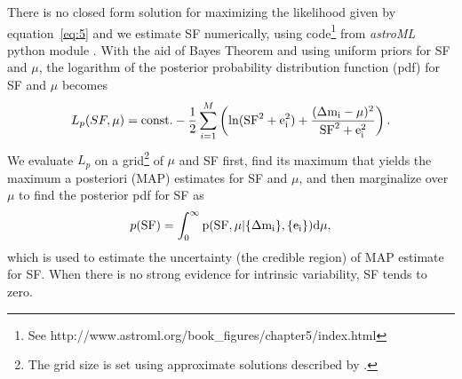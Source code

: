 \documentclass[fleqn,usenatbib]{mnras}
\begin{document}
There is no closed form solution for maximizing the likelihood given by equation~\ref{eq:5} and
we estimate SF numerically, using code\footnote{See http://www.astroml.org/book\_figures/chapter5/index.html}
from {\it astroML} python module \citep{astroML}. With the aid of Bayes Theorem and using uniform priors
for SF and $\mu$, the logarithm of the posterior probability distribution function (pdf) for SF and $\mu$ becomes
\begin{equation}
\label{eq:6}
L_p(SF,\mu) = {\rm const.} - {1\over2} \sum_{i=1}^M \left( \ln(\rm{SF}^2+e_i^2)
               + {  (\Delta m_i-\mu)^2 \over \rm{SF}^2+e_i^2} \right).
\end{equation}
We evaluate $L_{p}$ on a grid\footnote{The grid size is set using approximate solutions described by \cite{ivezic2014}.}
of $\mu$ and SF first, find its maximum that yields the maximum a posteriori (MAP) estimates for SF and $\mu$, 
and then marginalize over $\mu$ to find the posterior pdf for SF as 
\begin{equation}
p(\rm{SF}) = \int_{0}^{\infty} {p(\rm{SF}, \mu |\{\Delta m_{i}\}, \{e_{i}\})} d \mu,
\end{equation}
which is used to estimate the uncertainty (the credible region) of MAP estimate for SF. When there is no strong 
evidence for intrinsic variability, SF tends to zero. 
\end{document}
